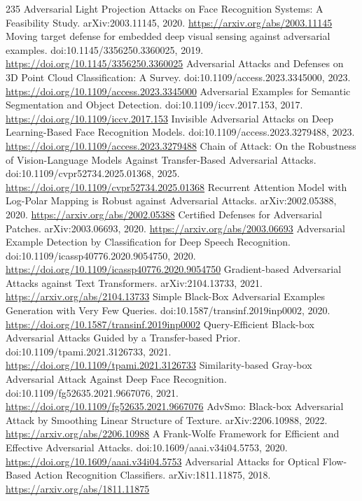 \documentclass[11pt]{article}
\begin{document}
\begin{thebibliography}{235}
 Adversarial Light Projection Attacks on Face Recognition Systems: A Feasibility Study. arXiv:2003.11145, 2020. \url{https://arxiv.org/abs/2003.11145}
 Moving target defense for embedded deep visual sensing against adversarial examples. doi:10.1145/3356250.3360025, 2019. \url{https://doi.org/10.1145/3356250.3360025}
 Adversarial Attacks and Defenses on 3D Point Cloud Classification: A Survey. doi:10.1109/access.2023.3345000, 2023. \url{https://doi.org/10.1109/access.2023.3345000}
 Adversarial Examples for Semantic Segmentation and Object Detection. doi:10.1109/iccv.2017.153, 2017. \url{https://doi.org/10.1109/iccv.2017.153}
 Invisible Adversarial Attacks on Deep Learning-Based Face Recognition Models. doi:10.1109/access.2023.3279488, 2023. \url{https://doi.org/10.1109/access.2023.3279488}
 Chain of Attack: On the Robustness of Vision-Language Models Against Transfer-Based Adversarial Attacks. doi:10.1109/cvpr52734.2025.01368, 2025. \url{https://doi.org/10.1109/cvpr52734.2025.01368}
 Recurrent Attention Model with Log-Polar Mapping is Robust against Adversarial Attacks. arXiv:2002.05388, 2020. \url{https://arxiv.org/abs/2002.05388}
 Certified Defenses for Adversarial Patches. arXiv:2003.06693, 2020. \url{https://arxiv.org/abs/2003.06693}
 Adversarial Example Detection by Classification for Deep Speech Recognition. doi:10.1109/icassp40776.2020.9054750, 2020. \url{https://doi.org/10.1109/icassp40776.2020.9054750}
 Gradient-based Adversarial Attacks against Text Transformers. arXiv:2104.13733, 2021. \url{https://arxiv.org/abs/2104.13733}
 Simple Black-Box Adversarial Examples Generation with Very Few Queries. doi:10.1587/transinf.2019inp0002, 2020. \url{https://doi.org/10.1587/transinf.2019inp0002}
 Query-Efficient Black-box Adversarial Attacks Guided by a Transfer-based Prior. doi:10.1109/tpami.2021.3126733, 2021. \url{https://doi.org/10.1109/tpami.2021.3126733}
 Similarity-based Gray-box Adversarial Attack Against Deep Face Recognition. doi:10.1109/fg52635.2021.9667076, 2021. \url{https://doi.org/10.1109/fg52635.2021.9667076}
 AdvSmo: Black-box Adversarial Attack by Smoothing Linear Structure of Texture. arXiv:2206.10988, 2022. \url{https://arxiv.org/abs/2206.10988}
 A Frank-Wolfe Framework for Efficient and Effective Adversarial Attacks. doi:10.1609/aaai.v34i04.5753, 2020. \url{https://doi.org/10.1609/aaai.v34i04.5753}
 Adversarial Attacks for Optical Flow-Based Action Recognition Classifiers. arXiv:1811.11875, 2018. \url{https://arxiv.org/abs/1811.11875}

\end{thebibliography}
\end{document}
